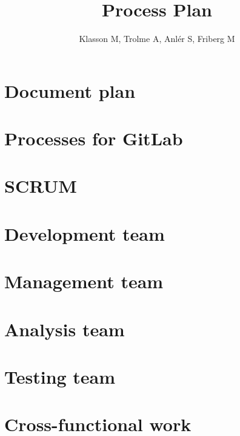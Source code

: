 \documentclass[12pt]{article}
\title{\Huge Process Plan}
\author{Klasson M, Trolme A, Anlér S, Friberg M}
\begin{document}



\setlength{\parskip}{1em}

    \section{Document plan}
    

    \clearpage
    \section{Processes for GitLab}
    

    \pagebreak
    \section{SCRUM}
    
    
    \pagebreak
    \section{Development team}
    
   
    \pagebreak
    \section{Management team}
    
    
    \pagebreak
    \section{Analysis team}
    
    
    \pagebreak
    \section{Testing team}
    
 
    \pagebreak
    \section{Cross-functional work}
    
    
\end{document}
